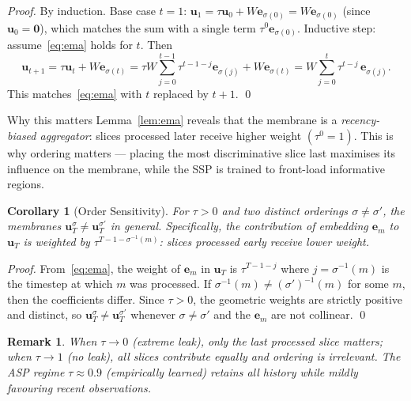 \documentclass[11pt,a4paper]{article}
\newtheorem{corollary}[theorem]{Corollary}
\newtheorem{remark}{Remark}[section]
\newcommand{\bu}{\mathbf{u}}
\newcommand{\be}{\mathbf{e}}
\newcommand{\bW}{W}
\begin{document}
\begin{proof}
By induction.  Base case $t=1$: $\bu_1 = \tau \bu_0 + \bW \be_{\sigma(0)} =
\bW \be_{\sigma(0)}$ (since $\bu_0 = \mathbf{0}$), which matches the sum with
a single term $\tau^0 \be_{\sigma(0)}$.  Inductive step: assume~\eqref{eq:ema}
holds for $t$.  Then
\[
  \bu_{t+1} = \tau \bu_t + \bW \be_{\sigma(t)}
  = \tau \bW \sum_{j=0}^{t-1} \tau^{t-1-j} \be_{\sigma(j)} + \bW \be_{\sigma(t)}
  = \bW \sum_{j=0}^{t} \tau^{t-j}\, \be_{\sigma(j)}.
\]
This matches~\eqref{eq:ema} with $t$ replaced by $t+1$.  \qed
\end{proof}

\begin{insightbox}{Why this matters}
Lemma~\ref{lem:ema} reveals that the membrane is a \emph{recency-biased aggregator}:
slices processed later receive higher weight $(\tau^0 = 1)$.  This is why ordering
matters --- placing the most discriminative slice last maximises its influence on
the membrane, while the SSP is trained to front-load informative regions.
\end{insightbox}

\begin{corollary}[Order Sensitivity]
\label{cor:order}
For $\tau > 0$ and two distinct orderings $\sigma \neq \sigma'$, the membranes
$\bu_T^\sigma \neq \bu_T^{\sigma'}$ in general.  Specifically, the contribution
of embedding $\be_m$ to $\bu_T$ is weighted by $\tau^{T-1-\sigma^{-1}(m)}$: slices
processed early receive lower weight.
\end{corollary}

\begin{proof}
From~\eqref{eq:ema}, the weight of $\be_m$ in $\bu_T$ is $\tau^{T-1-j}$ where
$j = \sigma^{-1}(m)$ is the timestep at which $m$ was processed.  If $\sigma^{-1}(m)
\neq (\sigma')^{-1}(m)$ for some $m$, then the coefficients differ.  Since $\tau > 0$,
the geometric weights are strictly positive and distinct, so $\bu_T^\sigma \neq
\bu_T^{\sigma'}$ whenever $\sigma \neq \sigma'$ and the $\be_m$ are not collinear.
\qed
\end{proof}

\begin{remark}
When $\tau \to 0$ (extreme leak), only the last processed slice matters;
when $\tau \to 1$ (no leak), all slices contribute equally and ordering is irrelevant.
The ASP regime $\tau \approx 0.9$ (empirically learned) retains all history while
mildly favouring recent observations.
\end{remark}
\end{document}
